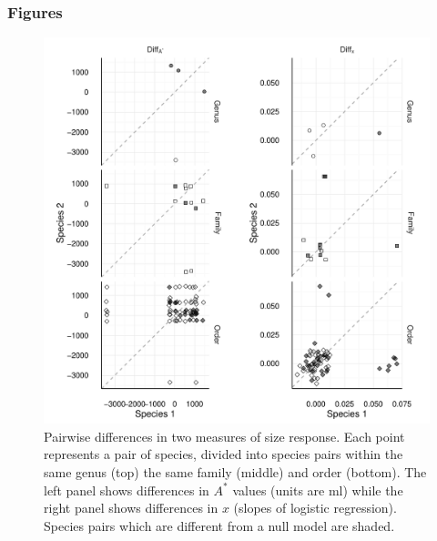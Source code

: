 \subsubsection{Figures}\label{figures}

\begin{figure}[htbp]
\centering
\includegraphics[width=5.5in]{figures/pairwise_astars.pdf}
\caption{Pairwise differences in two measures of size response. Each point represents a
pair of species, divided into species pairs within the same genus (top)
the same family (middle) and order (bottom). The left panel shows
differences in \(A^{*}\) values (units are ml) while the right panel
shows differences in \(x\) (slopes of logistic regression). Species
pairs which are different from a null model are shaded.}
\end{figure}

